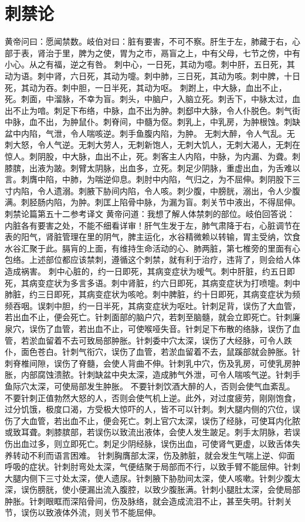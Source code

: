 \documentclass[a4paper,12pt,UTF8,twoside]{ctexbook}
\begin{document}
\chapter{刺禁论}
黄帝问曰：愿闻禁数。岐伯对曰：脏有要害，不可不察。肝生于左，肺藏于右，心部于表，肾治于里，脾为之使，胃为之市，鬲盲之上，中有父母，七节之傍，中有小心。从之有福，逆之有咎。
刺中心，一日死，其动为噫。刺中肝，五日死，其动为语。刺中肾，六日死，其动为嚏。刺中肺，三日死，其动为咳。刺中脾，十日死，其动为吞。刺中胆，一日半死，其动为呕。
刺跗上，中大脉，血出不止，死。刺面，中溜脉，不幸为盲。刺头，中脑户，入脑立死。刺舌下，中脉太过，血出不止为喑。刺足下布络，中脉，血不出为肿。刺郄中大脉，令人仆脱色。刺气街中脉，血不出，为肿鼠仆。刺脊间，中髓为伛。刺乳上，中乳房，为肿根蚀。刺缺盆中内陷，气泄，令人喘咳逆。刺手鱼腹内陷，为肿。
无刺大醉，令人气乱。无刺大怒，令人气逆。无刺大劳人，无刺新饱人，无刺大饥人，无刺大渴人，无刺在惊人。刺阴股，中大脉，血出不止，死。刺客主人内陷，中脉，为内漏、为聋。刺膝膑，出液为跛。刺臂太阴脉，出血多，立死。刺足少阴脉，重虚出血，为舌难以言。刺膺中陷，中肺，为喘逆仰息。刺肘中内陷，气归之，为不屈伸。刺阴股下三寸内陷，令人遗溺。刺腋下胁间内陷，令人咳。刺少腹，中膀胱，溺出，令人少腹满。刺胫肠内陷，为肿。刺匡上陷骨中脉，为漏为盲。刺关节中液出，不得屈伸。
刺禁论篇第五十二参考译文
黄帝问道：我想了解人体禁刺的部位。岐伯回答说：内脏各有要害之处，不能不细看详审！肝气生发于左，肺气肃降于右，心脏调节在表的阳气，肾脏管理在里的阴气，脾主运化，水谷精微赖以转输，胃主受纳，饮食水谷汇聚于此。膈肓的上面，有维持生命活动的心、肺两脏，第七椎旁的里面有心包络。上述部位都应该禁刺，遵循这个刺禁，就有利于治疗，违背了，则会给人体造成祸害。
刺中心脏的，约一日即死，其病变症状为嗳气。刺中肝脏，约五日即死，其病变症状为多言多语。刺中肾脏，约六日即死，其病变症状为打喷嚏。刺中肺脏，约三日即死，其病变症状为咳呛。刺中脾脏，约十日即死，其病变症状为频频吞咽。误刺中胆，约一日半死，其病变症状为呕吐。针刺足背，误伤了大血管，若出血不止，便会死亡。针刺面部的脑户穴，若刺至脑髓，就会立即死亡。针刺廉泉穴，误伤了血管，若出血不止，可使喉哑失音。针刺足下布散的络脉，误伤了血管，若淤血留着不去可致局部肿胀。针刺委中穴太深，误伤了大经脉，可令人跌仆，面色苍白。针刺气衔穴，误伤了血管，若淤血留着不去，鼠蹊部就会肿胀。针刺脊椎间隙，误伤了脊髓，会使人背曲不伸。针刺乳中穴，伤及乳房，可使乳房肿胀，内部腐蚀溃脓。针刺缺盆中央太深，造成肺气外泄，可令人喘咳气逆。针刺手鱼际穴太深，可使局部发生肿胀。
不要针刺饮酒大醉的人，否则会使气血紊乱。不要针刺正值勃然大怒的人，否则会使气机上逆。此外，对过度疲劳，刚刚饱食，过分饥饿，极度口渴，方受极大惊吓的人，皆不可以针刺。刺大腿内侧的穴位，误伤了大血管，若出血不止，便会死亡。刺上官穴太深，误伤了经脉，可使耳内化脓或致耳聋。刺膝膑部，若误伤以致流出液体，会使人发生跛足。刺手太阴脉，若误伤出血过多，则立即死亡。刺足少阴经脉，误伤出血，可使肾气更虚，以致舌体失养转动不利而语言困难。
针刺胸膺部太深，伤及肺脏，就会发生气喘上逆、仰面呼吸的症状。针刺肘弯处太深，气便结聚于局部而不行，以致手臂不能屈伸。针刺大腿内侧下三寸处太深，使人遗尿。针刺腋下胁肋间太深，使人咳嗽。针刺少腹太深，误伤膀胱，使小便漏出流入腹腔，以致少腹胀满。针刺小腿肚太深，会使局部肿胀。针刺眼眶而深陷骨间，伤及脉络，就会造成流泪不止，甚至失明。针刺关节，误伤以致液体外流，则关节不能屈伸。
\end{document}
